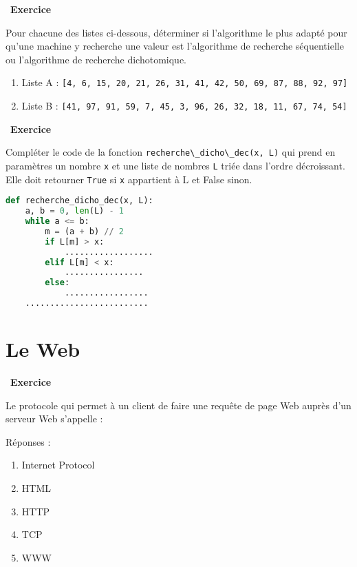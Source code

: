 \documentclass[
  11pt,
]{article}
\newcommand{\passthrough}[1]{#1}
\providecommand{\tightlist}{%
  \setlength{\itemsep}{0pt}\setlength{\parskip}{0pt}}
\newcounter{exo}
\newenvironment{exercice}[1]
{\par \medskip   \addtocounter{exo}{1} \noindent  
\begin{bclogo}[arrondi =0.1,   noborder = true, logo=\bccrayon, marge=4]{~\textbf{Exercice} \textbf{\theexo} {\itshape #1} }  \par}
{
\end{bclogo}
 \par \bigskip }
\newcounter{thme}
\newcounter{def}
\newcounter{alg}
\begin{document}
\begin{exercice}{}

Pour chacune des listes ci-dessous, déterminer si l'algorithme le plus
adapté pour qu'une machine y recherche une valeur est l'algorithme de
recherche séquentielle ou l'algorithme de recherche dichotomique.

\begin{enumerate}
\def\labelenumi{\arabic{enumi}.}
\tightlist
\item
  Liste A :
  \passthrough{\lstinline![4, 6, 15, 20, 21, 26, 31, 41, 42, 50, 69, 87, 88, 92, 97]!}
\item
  Liste B :
  \passthrough{\lstinline![41, 97, 91, 59, 7, 45, 3, 96, 26, 32, 18, 11, 67, 74, 54]!}
\end{enumerate}

\end{exercice}

\begin{exercice}{}

Compléter le code de la fonction
\passthrough{\lstinline!recherche\_dicho\_dec(x, L)!} qui prend en
paramètres un nombre \passthrough{\lstinline!x!} et une liste de nombres
\passthrough{\lstinline!L!} triée dans l'ordre décroissant. Elle doit
retourner \passthrough{\lstinline!True!} si \passthrough{\lstinline!x!}
appartient à L et False sinon.

\begin{lstlisting}[language=Python]
def recherche_dicho_dec(x, L):
    a, b = 0, len(L) - 1
    while a <= b:
        m = (a + b) // 2
        if L[m] > x:
            ..................
        elif L[m] < x:
            ................
        else:
            .................
    .........................
\end{lstlisting}

\end{exercice}

\hypertarget{le-web}{%
\section{Le Web}\label{le-web}}

\begin{exercice}{}

Le protocole qui permet à un client de faire une requête de page Web
auprès d'un serveur Web s'appelle :

Réponses :

\begin{enumerate}
\def\labelenumi{\arabic{enumi}.}
\tightlist
\item
  Internet Protocol
\item
  HTML
\item
  HTTP
\item
  TCP
\item
  WWW
\end{enumerate}

\end{exercice}
\end{document}
